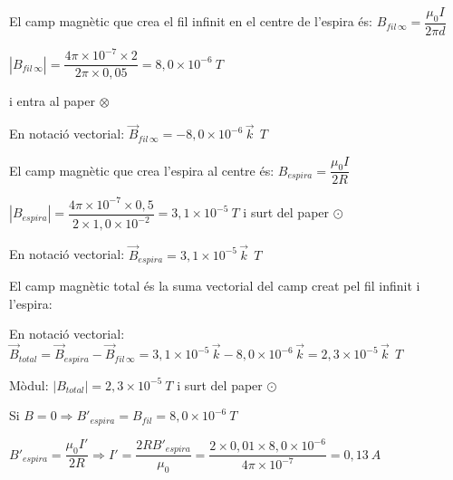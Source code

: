 \begin{solapartat}

El camp magnètic que crea el fil infinit en el centre de l'espira és: $B_{\mathit{fil}\,\infty} = \dfrac{\mu_0 I}{2\pi d}$

 $\left|B_{\mathit{fil}\,\infty}\right| = \dfrac{4\pi\times 10^{-7}\times 2}{2\pi\times 0,05} = 8,0\times 10^{-6}\ T$

 i entra al paper $\otimes$

En notació vectorial: $\vec{B}_{\mathit{fil}\,\infty} = -8,0\times 10^{-6}\,\vec{k}\ \ T$

El camp magnètic que crea l'espira al centre és: $B_{\mathit{espira}} = \dfrac{\mu_0 I}{2R}$

 $\left|B_{\mathit{espira}}\right| = \dfrac{4\pi\times 10^{-7}\times 0,5}{2\times 1,0\times 10^{-2}} = 3,1\times 10^{-5}\ T$ i surt del paper $\odot$ 

En notació vectorial: $\vec{B}_{\mathit{espira}} = 3,1\times 10^{-5}\,\vec{k}\ \ T$
\end{solapartat}

\begin{solapartat}
El camp magnètic total és la suma vectorial del camp creat pel fil infinit i l'espira:

En notació vectorial:\\
$\vec{B}_{\mathit{total}} = \vec{B}_{\mathit{espira}} - \vec{B}_{\mathit{fil}\,\infty} = 3,1\times 10^{-5}\,\vec{k} - 8,0\times 10^{-6}\,\vec{k} = 2,3\times 10^{-5}\,\vec{k}\ \ T$

 Mòdul: $\left|B_{\mathit{total}}\right| = 2,3\times 10^{-5}\ T$ i surt del paper $\odot$ 

 Si $B = 0 \Rightarrow B'_{\mathit{espira}} = B_{\mathit{fil}} = 8,0\times 10^{-6}\ T$

 $B'_{\mathit{espira}} = \dfrac{\mu_0 I'}{2R} \Rightarrow I' = \dfrac{2RB'_{\mathit{espira}}}{\mu_0} = \dfrac{2\times 0,01\times 8,0\times 10^{-6}}{4\pi\times 10^{-7}} = 0,13\ A$
\end{solapartat}

